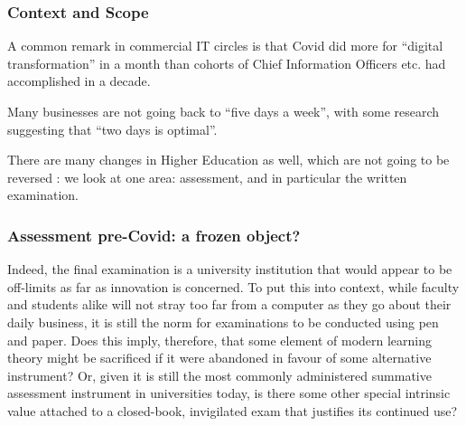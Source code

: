\frame{
\titlepage
}
\begin{frame}[fragile]
\frametitle{Context and Scope}
\pause
A common remark in commercial IT circles is that Covid did more for ``digital transformation'' in a month than cohorts of Chief  Information Officers etc. had accomplished in a decade. 
\pause\par
 Many businesses are not going back to ``five days a week'', with some research \cite{Bindley2022a} suggesting that ``two days is optimal''.
\par\pause
There are many changes in Higher Education as well, which are not going to be reversed \cite{Crick2021a}: we look at one area: assessment, and in particular the written examination.
\end{frame}
\begin{frame}[fragile]
\frametitle{Assessment pre-Covid: a frozen object?}
\pause
Indeed, the final examination is a university institution that would appear to be off-limits as far as innovation is concerned. To put this into context, while faculty and students alike will not stray too far from a computer as they go about their daily business, it is still the norm for examinations to be conducted using pen and paper. Does this imply, therefore, that some element of modern learning theory might be sacrificed if it were abandoned in favour of some alternative instrument? Or, given it is still the most commonly administered summative assessment instrument in universities today, is there some other special intrinsic value attached to a closed-book, invigilated exam that justifies its continued use?
\cite{WilliamsWong2009a}
\end{frame}
